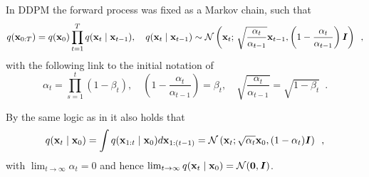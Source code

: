 In DDPM the forward process was fixed as a Markov chain, such that
\begin{equation}
    q({\mathbf{x}}_{0:T}) = q({\mathbf{x}}_0) \prod_{t=1}^T q({\mathbf{x}}_t \mid {\mathbf{x}}_{t-1}), 
    \quad
    q({\mathbf{x}}_t \mid {\mathbf{x}}_{t-1}) \sim \mathcal{N}\left({\mathbf{x}}_t;\, 
    \sqrt{\frac{\alpha_t}{\alpha_{t-1}}}
    {\mathbf{x}}_{t-1}, \left(1 - \frac{\alpha_t}{\alpha_{t-1}}\right) {\bm{I}}\right) \enspace ,
\end{equation}
with the following link to the initial notation of \cite{ho_denoising_2020}
\begin{equation}
    \alpha_t = \prod_{s=1}^t (1 - \beta_t), \quad \left(1 - \frac{\alpha_t}{\alpha_{t-1}}\right) = \beta_t, \quad \sqrt{\frac{\alpha_t}{\alpha_{t-1}}} = \sqrt{1-\beta_t} \enspace .
\end{equation}

By the same logic as in \cite{ho_denoising_2020} it also holds that
\begin{equation}
    q({\mathbf{x}}_t \mid {\mathbf{x}}_0) = \int q({\mathbf{x}}_{1:t} \mid {\mathbf{x}}_0) d{\mathbf{x}}_{1:(t-1)} 
    = \mathcal{N} \left( {\mathbf{x}}_t;
    \sqrt{\alpha_t} {\mathbf{x}}_0,
    (1 - \alpha_t) {\bm{I}}
    \right) \enspace , 
\end{equation}
with $\lim_{t \to \infty} \alpha_t = 0$ and hence $\lim_{t \to \infty} q({\mathbf{x}}_t \mid {\mathbf{x}}_0) = \mathcal{N}(\mathbf{0}, {\bm{I}})$.

